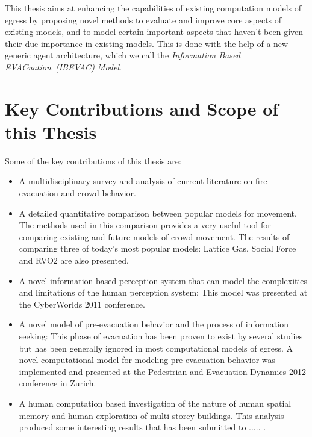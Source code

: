 This thesis aims at enhancing the capabilities of existing computation models of egress by proposing novel methods to evaluate and improve core aspects of existing models, and to model certain important aspects that haven't been given their due importance in existing models. This is done with the help of a new generic agent architecture, which we call the \emph{Information Based EVACuation~(IBEVAC) Model}.


\section{Key Contributions and Scope of this Thesis}
\label{Intro:Contributions}

Some of the key contributions of this thesis are:
\begin{itemize}
	\item A multidisciplinary survey and analysis of current literature on fire evacuation and crowd behavior.

	\item A detailed quantitative comparison between popular models for movement. The methods used in this comparison provides a very useful tool for comparing existing and future models of crowd movement. The results of comparing three of today's most popular models: Lattice Gas, Social Force and RVO2 are also presented.

	\item A novel information based perception system that can model the complexities and limitations of the human perception system: This model was presented at the CyberWorlds 2011 conference.

	\item A novel model of pre-evacuation behavior and the process of information seeking: This phase of evacuation has been proven to exist by several studies but has been generally ignored in most computational models of egress. A novel computational model for modeling pre evacuation behavior was implemented and presented at the Pedestrian and Evacuation Dynamics 2012 conference in Zurich.

	\item A human computation based investigation of the nature of human spatial memory and human exploration of multi-storey buildings. This analysis produced some interesting results that has been submitted to  .....  .



\end{itemize}


